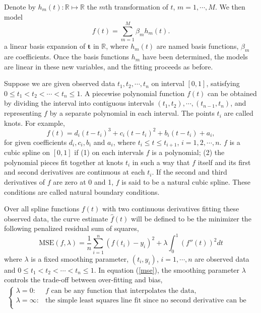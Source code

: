 Denote by $h_m(t):\mathbb{R} \mapsto \mathbb{R}$ the $m$th transformation of $t$, $m =1, \cdots ,M$. We then model
\begin{equation}\label{fbasis}
f(t) =\sum_{m=1}^{M}\beta_mh_m(t).
\end{equation}
a linear basis expansion of $\mathbf{t}$ in $\mathbb{R}$, where $h_m(t)$ are named basis functions, $\beta_m$ are coefficients. Once the basis functions $h_m$ have been determined, the models are linear in these new variables, and the fitting proceeds as before.

Suppose we are given observed data $t_1,t_2, \cdots, t_n$ on interval $[0,1]$, satisfying $0\leq t_1< t_2 < \cdots <t_n \leq 1$. A piecewise polynomial function $f(t)$ can be obtained by dividing the interval into contiguous
intervals $(t_1,t_2),\cdots,(t_{n-1},t_n)$, and representing $f$ by a separate polynomial in each interval. The points $t_i$ are called knots. For example,
\begin{equation}
f(t)=d_i(t-t_i)^3+c_i(t-t_i)^2+b_i(t-t_i)+a_i,
\end{equation}
for given coefficients $d_i, c_i, b_i$ and $a_i$, where $t_i\leq t\leq t_{i+1}$, $i=1,2,\cdots,n$. $f$ is a cubic spline on $[0,1]$ if (1) on each intervals $f$ is a polynomial; (2) the polynomial pieces fit together at knots $t_i$ in such a way that $f$ itself and its first and second derivatives are continuous at each $t_i$. If the second and third derivatives of $f$ are zero at 0 and 1, $f$ is said to be a natural cubic spline. These conditions are called natural boundary conditions.

Over all spline functions $f(t)$ with two continuous derivatives fitting these observed data, the curve estimate  $\hat{f}(t)$ will be defined to be the minimizer the following penalized residual sum of squares, 
\begin{equation}\label{mse}
\text{MSE}(f,\lambda)=\frac{1}{n}\sum_{i=1}^n(f(t_i)-y_i)^2+\lambda \int_{0}^{1}(f''(t))^2dt
\end{equation}
where $\lambda$ is a fixed smoothing parameter, $(t_i,y_i)$, $i=1, \cdots, n$ are observed data and $0 \leq t_1< t_2 < \cdots <t_n \leq 1$. In equation (\ref{mse}),  the smoothing parameter $\lambda$ controls the trade-off between over-fitting and bias,
\begin{align}
\begin{cases}
\lambda = 0 : & \mbox{$f$ can be any function that interpolates the data,}\\
\lambda = \infty: & \mbox{the simple least squares line fit since no second derivative can be tolerated.}\\
\end{cases}
\end{align}


